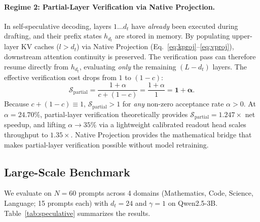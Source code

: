 \documentclass{article}
\newcommand{\dt}{d_t}
\begin{document}
\paragraph{Regime 2: Partial-Layer Verification via Native Projection.}
In self-speculative decoding, layers $1 \dots \dt$ have \emph{already} been executed during drafting, and their prefix states $h_{\dt}$ are stored in memory. By populating upper-layer KV caches ($l > \dt$) via Native Projection (Eq.~\ref{eq:kproj}--\ref{eq:vproj}), downstream attention continuity is preserved. The verification pass can therefore resume directly from $h_{\dt}$, evaluating \emph{only} the remaining $(L - \dt)$ layers. The effective verification cost drops from $1$ to $(1 - c)$:
\begin{equation}
    \mathcal{S}_{\text{partial}} = \frac{1 + \alpha}{c + (1 - c)} = \frac{1 + \alpha}{1} = \mathbf{1 + \alpha}.
    \label{eq:speedup_partial}
\end{equation}
Because $c + (1 - c) \equiv 1$, $\mathcal{S}_{\text{partial}} > 1$ for \emph{any} non-zero acceptance rate $\alpha > 0$. At $\alpha = 24.70\%$, partial-layer verification theoretically provides $\mathcal{S}_{\text{partial}} = \mathbf{1.247\times}$ net speedup, and lifting $\alpha \to 35\%$ via a lightweight calibrated readout head scales throughput to $\mathbf{1.35\times}$. Native Projection provides the mathematical bridge that makes partial-layer verification possible without model retraining.

\subsection{Large-Scale Benchmark}

We evaluate on $N{=}60$ prompts across 4 domains (Mathematics, Code, Science, Language; 15 prompts each) with $\dt{=}24$ and $\gamma{=}1$ on Qwen2.5-3B. Table~\ref{tab:speculative} summarizes the results.
\end{document}
